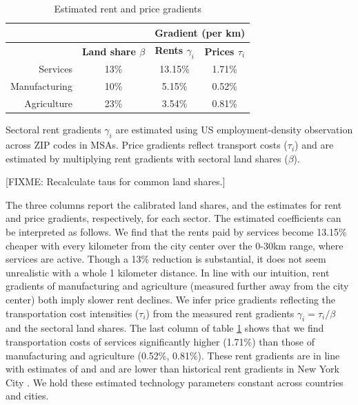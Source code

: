 \documentclass[12pt]{article}
\begin{document}
\begin{table}[h!]
  \begin{center}
  \caption{Estimated rent and price gradients}
    \begin{tabular}{rccc}
    \toprule
    \textbf{} & \textbf{} & \multicolumn{2}{c}{\textbf{Gradient (per km)}}\\
    \midrule
    \textbf{} & \textbf{Land share $\beta$ } & \textbf{Rents $\gamma_i$} & \textbf{Prices $\tau_i$} \\
    Services & 13\%  & 13.15\% & 1.71\% \\
    Manufacturing & 10\%  & 5.15\% & 0.52\% \\
    Agriculture & 23\%  & 3.54\% & 0.81\% \\
    \bottomrule
    \end{tabular}%

  \end{center}
  \label{tab:EmpGrad}%

  \noindent \footnotesize{Sectoral rent gradients $\gamma_i$ are estimated using US employment-density observation across ZIP codes in MSAs. Price gradients reflect transport costs ($\tau_i$) and are estimated by multiplying rent gradients with sectoral land shares ($\beta$). }
\end{table}%

[FIXME: Recalculate taus for common land shares.]

The three columns report the calibrated land shares, and the estimates for rent and price gradients, respectively, for each sector. The estimated coefficients can be interpreted as follows. We find that the rents paid by services become 13.15\% cheaper with every kilometer from the city center over the 0-30km range, where services are active. Though a 13\% reduction is substantial, it does not seem unrealistic with a whole 1 kilometer distance. In line with our intuition, rent gradients of manufacturing and agriculture (measured further away from the city center) both imply slower rent declines. We infer price gradients reflecting the transportation cost intensities ($\tau_i$) from the measured rent gradients $\gamma_i=\tau_i/\beta$ and the sectoral land shares. The last column of table \ref{tab:EmpGrad} shows that we find transportation costs of services significantly higher (1.71\%) than those of manufacturing and agriculture (0.52\%, 0.81\%). These rent gradients are in line with estimates of  and  and are lower than historical rent gradients in New York City \cite{Atack1998}. We hold these estimated technology parameters constant across countries and cities.
\end{document}
